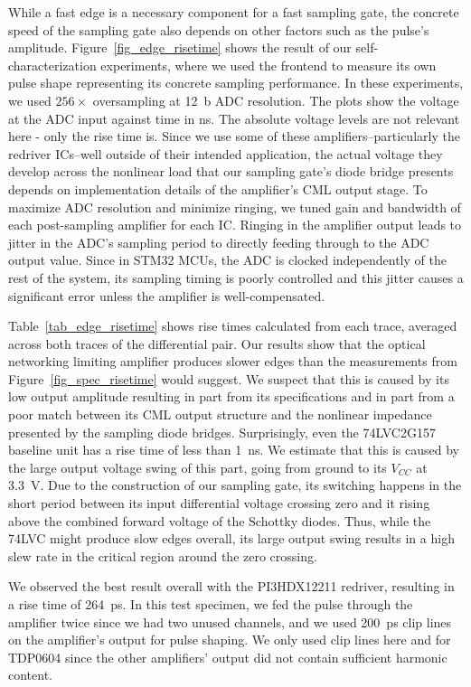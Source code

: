 \documentclass[final]{iacrtrans}
\newcommand{\partno}[1]{\textsf{\small#1}}
\begin{document}
While a fast edge is a necessary component for a fast sampling gate, the concrete speed of the sampling gate also
depends on other factors such as the pulse's amplitude. Figure\ \ref{fig_edge_risetime} shows the result of our
self-characterization experiments, where we used the frontend to measure its own pulse shape representing its concrete
sampling performance. In these experiments, we used $256\times$ oversampling at \qty{12}{b} ADC resolution. The plots
show the voltage at the ADC input against time in \unit{\nano\second}. The absolute voltage levels are not relevant here
- only the rise time is. Since we use some of these amplifiers--particularly the redriver ICs--well outside of their
intended application, the actual voltage they develop across the nonlinear load that our sampling gate's diode bridge
presents depends on implementation details of the amplifier's CML output stage. To maximize ADC resolution and minimize
ringing, we tuned gain and bandwidth of each post-sampling amplifier for each IC. Ringing in the amplifier output leads
to jitter in the ADC's sampling period to directly feeding through to the ADC output value. Since in \partno{STM32}
MCUs, the ADC is clocked independently of the rest of the system, its sampling timing is poorly
controlled and this jitter causes a significant error unless the amplifier is well-compensated.

Table\ \ref{tab_edge_risetime} shows rise times calculated from each trace, averaged across both traces of the
differential pair. Our results show that the optical networking limiting amplifier produces slower edges than the
measurements from Figure\ \ref{fig_spec_risetime} would suggest. We suspect that this is caused by its low output
amplitude resulting in part from its specifications and in part from a poor match between its CML output structure and
the nonlinear impedance presented by the sampling diode bridges. Surprisingly, even the \partno{74LVC2G157} baseline
unit has a rise time of less than \qty{1}{\nano\second}. We estimate that this is caused by the large output voltage
swing of this part, going from ground to its $V_{CC}$ at \qty{3.3}{\volt}. Due to the construction of our sampling gate,
its switching happens in the short period between its input differential voltage crossing zero and it rising above the
combined forward voltage of the Schottky diodes. Thus, while the \partno{74LVC} might produce slow edges overall, its
large output swing results in a high slew rate in the critical region around the zero crossing.

We observed the best result overall with the \partno{PI3HDX12211} redriver, resulting in a rise time of
\qty{264}{\pico\second}. In this test specimen, we fed the pulse through the amplifier twice since we had two unused
channels, and we used \qty{200}{\pico\second} clip lines on the amplifier's output for pulse shaping. We only used clip
lines here and for \partno{TDP0604} since the other amplifiers' output did not contain sufficient harmonic content.
\end{document}
